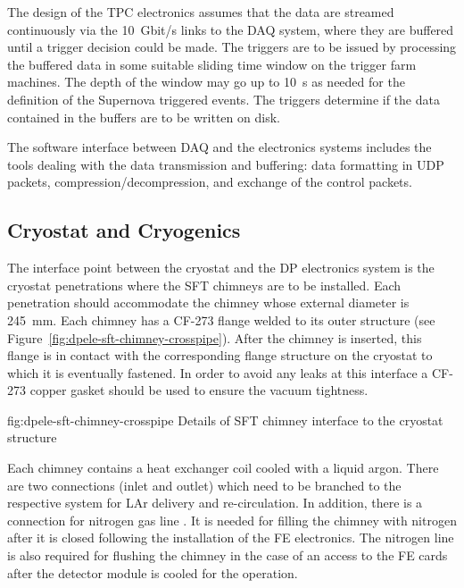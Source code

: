 The design of the TPC electronics assumes that the data are streamed continuously via the \SI{10}{Gbit/s} links to the DAQ system, where they are buffered until a trigger decision could be made. The triggers are to be issued by processing the buffered data in some suitable sliding time window on the trigger farm machines. The depth of the window may go up to \SI{10}{s} as needed for the definition of the Supernova triggered events. The triggers determine if the data contained in the buffers are to be written on disk. 

The software interface between DAQ and the electronics systems includes the tools dealing with the data transmission and buffering: data formatting in UDP packets, compression/decompression, and exchange of the control packets.

\subsection{Cryostat and Cryogenics}
\label{sec:fddp-tpc-elec-intfc-cryo}

The interface point between the cryostat and the DP electronics system is the cryostat penetrations where the SFT chimneys are to be installed. Each penetration should accommodate the chimney whose external diameter is \SI{245}{\mm}. Each chimney has a CF-273 flange welded to its outer structure (see Figure~\ref{fig:dpele-sft-chimney-crosspipe}). After the chimney is inserted, this flange is in contact with the corresponding flange structure on the cryostat to which it is eventually fastened. In order to avoid any leaks at this interface a CF-273 copper gasket should be used to ensure the vacuum tightness.  

\begin{dunefigure}{fig:dpele-sft-chimney-crosspipe}
{Details of SFT chimney interface to the cryostat structure}
\end{dunefigure}

Each chimney contains a heat exchanger coil cooled with a liquid argon. There are two  connections (inlet and outlet) which need to be branched to the respective system for LAr delivery and re-circulation. In addition, there is a connection for nitrogen gas line . It is needed for filling the chimney with nitrogen after it is closed following the installation of the FE electronics. The nitrogen line is also required for flushing the chimney in the case of an access to the FE cards after the detector module is cooled for the operation. 

